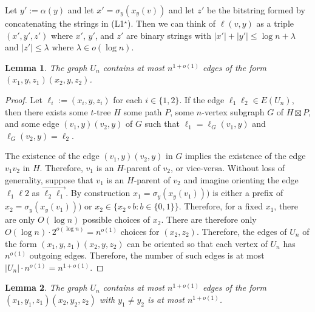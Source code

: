 \documentclass{patmorin}
\newtheorem{lemma}{Lemma}
\begin{document}
Let $y':=\alpha(y)$ and let $x'=\sigma_y(x_y(v))$ and let $z'$ be the bitstring formed by concatenating the strings in (L1$^\star$).  Then we can think of $\ell(v,y)$ as a triple $(x',y',z')$ where $x'$, $y'$, and $z'$ are binary strings with $|x'|+|y'|\le \log n + \lambda$ and $|z'|\le \lambda$ where $\lambda\in o(\log n)$.

\begin{lemma}\label{flat-edges}
    The graph $U_n$ contains at most $n^{1+o(1)}$ edges of the form $(x_1,y,z_1)(x_2,y,z_2)$.
\end{lemma}

\begin{proof}
    Let $\ell_i:=(x_i,y,z_i)$ for each $i\in\{1,2\}$.  If the edge $\ell_1\ell_2\in E(U_n)$, then there exists some $t$-tree $H$ some path $P$, some $n$-vertex subgraph $G$ of $H\boxtimes P$, and some edge $(v_1,y)(v_2,y)$ of $G$ such that $\ell_1=\ell_G(v_1,y)$ and $\ell_G(v_2,y)=\ell_2$.

    The existence of the edge $(v_1,y)(v_2,y)$ in $G$ implies the existence of the edge $v_1v_2$ in $H$.  Therefore, $v_1$ is an $H$-parent of $v_2$, or vice-versa.  Without loss of generality, suppose that $v_1$ is an $H$-parent of $v_2$ and imagine orienting the edge $\ell_1\ell2$ as $\overrightarrow{\ell_2\ell_1}$.  By construction $x_1=\sigma_y(x_y(v_1)))$ is either a prefix of $x_2=\sigma_y(x_y(v_1)))$ or $x_2\in \{x_2\circ b : b\in\{0,1\}\}$.  Therefore, for a fixed $x_1$, there are only $O(\log n)$ possible choices of $x_2$.  There are therefore only $O(\log n)\cdot 2^{o(\log n)}=n^{o(1)}$ choices for $(x_2,z_2)$.  Therefore, the edges of $U_n$ of the form $(x_1,y,z_1)(x_2,y,z_2)$ can be oriented so that each vertex of $U_n$ has $n^{o(1)}$ outgoing edges. Therefore, the number of such edges is at most $|U_n|\cdot n^{o(1)} = n^{1+o(1)}$.
\end{proof}

\begin{lemma}\label{flat-edges}
    The graph $U_n$ contains at most $n^{1+o(1)}$ edges of the form $(x_1,y_1,z_1)(x_2,y_2,z_2)$ with $y_1\neq y_2$ is at most $n^{1+o(1)}$.
\end{lemma}
\end{document}
